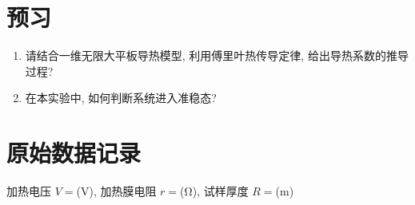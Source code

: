 \documentclass[signature=data]{physicsreport}
\begin{document}
\maketitle

\section{预习}
\begin{enumerate}
    \item 请结合一维无限大平板导热模型, 利用傅里叶热传导定律, 给出导热系数的推导过程?
    \item 在本实验中, 如何判断系统进入准稳态?
\end{enumerate}

\makeatletter
{}
\makeatother

\newpage
\section{原始数据记录}
\begin{center}
    加热电压 $V=$\qquad (V), 加热膜电阻 $r=$\qquad (\unit{\ohm}), 试样厚度 $R=$\qquad (m)
\end{center}

\begingroup
\end{document}
